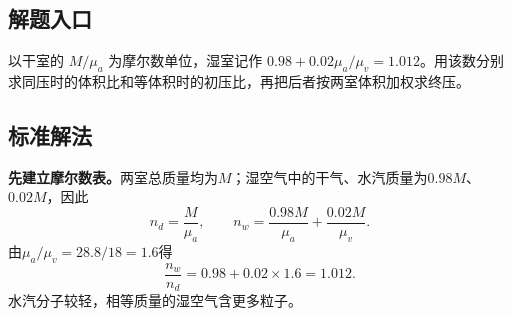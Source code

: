 \documentclass[UTF8,fontset=fandol,a4paper,11pt]{ctexart}
\begin{document}

\subsection*{解题入口}

以干室的 $M/\mu_a$ 为摩尔数单位，湿室记作 $0.98+0.02\mu_a/\mu_v=1.012$。用该数分别求同压时的体积比和等体积时的初压比，再把后者按两室体积加权求终压。



\subsection*{标准解法}

\textbf{先建立摩尔数表。}两室总质量均为$M$；湿空气中的干气、水汽质量为$0.98M$、$0.02M$，因此
\[n_d=\frac M{\mu_a},\qquad
n_w=\frac{0.98M}{\mu_a}+\frac{0.02M}{\mu_v}.\]
由$\mu_a/\mu_v=28.8/18=1.6$得
\[\frac{n_w}{n_d}=0.98+0.02\times1.6=1.012.\]
水汽分子较轻，相等质量的湿空气含更多粒子。
\end{document}
